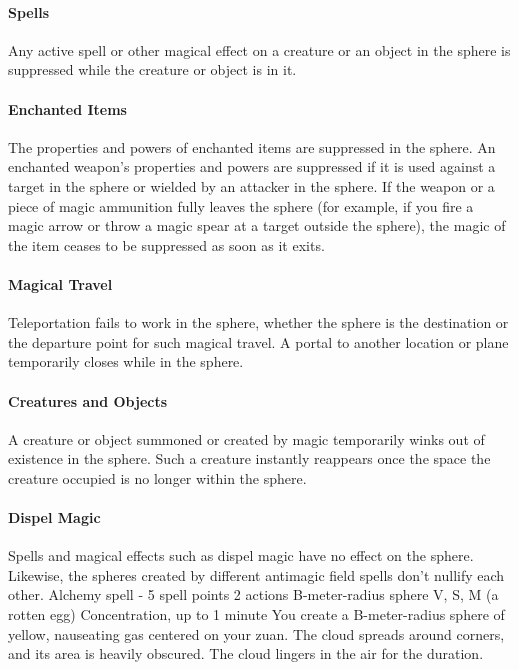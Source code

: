         \paragraph{Spells}
        Any active spell or other magical effect on a creature or an object in the sphere is suppressed while the creature or object is in it.

        \paragraph{Enchanted Items}
        The properties and powers of enchanted items are suppressed in the sphere.
        An enchanted weapon's properties and powers are suppressed if it is used against a target in the sphere or wielded by an attacker in the sphere.
        If the weapon or a piece of magic ammunition fully leaves the sphere (for example, if you fire a magic arrow or throw a magic spear at a target outside the sphere), the magic of the item ceases to be suppressed as soon as it exits.

        \paragraph{Magical Travel}
        Teleportation fails to work in the sphere, whether the sphere is the destination or the departure point for such magical travel.
        A portal to another location or plane  temporarily closes while in the sphere.

        \paragraph{Creatures and Objects}
        A creature or object summoned or created by magic temporarily winks out of existence in the sphere.
        Such a creature instantly reappears once the space the creature occupied is no longer within the sphere.

        \paragraph{Dispel Magic}
        Spells and magical effects such as dispel magic have no effect on the sphere.
        Likewise, the spheres created by different antimagic field spells don't nullify each other.
        {Alchemy spell - 5 spell points}
        {2 actions}
        {B-meter-radius sphere}
        {V, S, M (a rotten egg)}
        {Concentration, up to 1 minute}
        You create a B-meter-radius sphere of yellow, nauseating gas centered on your zuan.
        The cloud spreads around corners, and its area is heavily obscured.
        The cloud lingers in the air for the duration.

